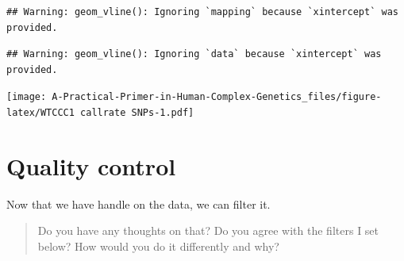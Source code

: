 \documentclass[
]{book}
\newenvironment{Shaded}{\begin{snugshade}}{\end{snugshade}}
\newcommand{\AttributeTok}[1]{\textcolor[rgb]{0.77,0.63,0.00}{#1}}
\newcommand{\ConstantTok}[1]{\textcolor[rgb]{0.00,0.00,0.00}{#1}}
\newcommand{\DecValTok}[1]{\textcolor[rgb]{0.00,0.00,0.81}{#1}}
\newcommand{\FloatTok}[1]{\textcolor[rgb]{0.00,0.00,0.81}{#1}}
\newcommand{\FunctionTok}[1]{\textcolor[rgb]{0.00,0.00,0.00}{#1}}
\newcommand{\NormalTok}[1]{#1}
\newcommand{\OtherTok}[1]{\textcolor[rgb]{0.56,0.35,0.01}{#1}}
\newcommand{\SpecialCharTok}[1]{\textcolor[rgb]{0.00,0.00,0.00}{#1}}
\newcommand{\StringTok}[1]{\textcolor[rgb]{0.31,0.60,0.02}{#1}}
\begin{document}
\begin{Shaded}
\end{Shaded}

\begin{verbatim}
## Warning: geom_vline(): Ignoring `mapping` because `xintercept` was provided.
\end{verbatim}

\begin{verbatim}
## Warning: geom_vline(): Ignoring `data` because `xintercept` was provided.
\end{verbatim}

\texttt{[image: A-Practical-Primer-in-Human-Complex-Genetics\_files/figure-latex/WTCCC1 callrate SNPs-1.pdf]}

\hypertarget{quality-control-1}{%
\section{Quality control}\label{quality-control-1}}

Now that we have handle on the data, we can filter it.

\begin{quote}
Do you have any thoughts on that? Do you agree with the filters I set below? How would you do it differently and why?
\end{quote}
\end{document}
